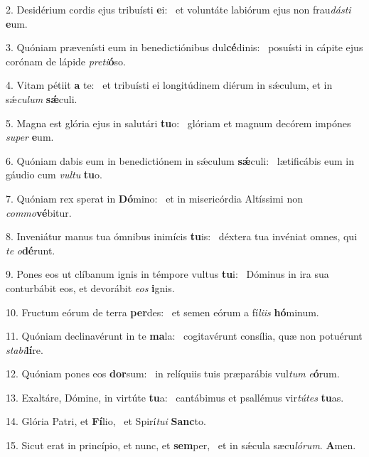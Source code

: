 2. Desidérium cordis ejus tribuísti \textbf{e}i: \ast\  et voluntáte labiórum ejus non frau\textit{dás}\textit{ti} \textbf{e}um.\

3. Quóniam prævenísti eum in benedictiónibus dul\textbf{cé}dinis: \ast\  posuísti in cápite ejus corónam de lápide \textit{pre}\textit{ti}\textbf{ó}so.\

4. Vitam pétiit \textbf{a} te: \ast\  et tribuísti ei longitúdinem diérum in sǽculum, et in sǽ\textit{cu}\textit{lum} \textbf{sǽ}culi.\

5. Magna est glória ejus in salutári \textbf{tu}o: \ast\  glóriam et magnum decórem impónes \textit{su}\textit{per} \textbf{e}um.\

6. Quóniam dabis eum in benedictiónem in sǽculum \textbf{sǽ}culi: \ast\  lætificábis eum in gáudio cum \textit{vul}\textit{tu} \textbf{tu}o.\

7. Quóniam rex sperat in \textbf{Dó}mino: \ast\  et in misericórdia Altíssimi non \textit{com}\textit{mo}\textbf{vé}bitur.\

8. Inveniátur manus tua ómnibus inimícis \textbf{tu}is: \ast\  déxtera tua invéniat omnes, qui \textit{te} \textit{o}\textbf{dé}runt.\

9. Pones eos ut clíbanum ignis in témpore vultus \textbf{tu}i: \ast\  Dóminus in ira sua conturbábit eos, et devorábit \textit{e}\textit{os} \textbf{i}gnis.\

10. Fructum eórum de terra \textbf{per}des: \ast\  et semen eórum a fí\textit{li}\textit{is} \textbf{hó}minum.\

11. Quóniam declinavérunt in te \textbf{ma}la: \ast\  cogitavérunt consília, quæ non potuérunt \textit{sta}\textit{bi}\textbf{lí}re.\

12. Quóniam pones eos \textbf{dor}sum: \ast\  in relíquiis tuis præparábis vul\textit{tum} \textit{e}\textbf{ó}rum.\

13. Exaltáre, Dómine, in virtúte \textbf{tu}a: \ast\  cantábimus et psallémus vir\textit{tú}\textit{tes} \textbf{tu}as.\

14. Glória Patri, et \textbf{Fí}lio, \ast\  et Spirí\textit{tu}\textit{i} \textbf{Sanc}to.\

15. Sicut erat in princípio, et nunc, et \textbf{sem}per, \ast\  et in sǽcula sæcu\textit{ló}\textit{rum}. \textbf{A}men.\

